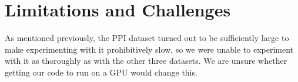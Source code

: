 \documentclass{article}
\begin{document}
    \section{Limitations and Challenges}\label{sec:limitations-and-challenges}
    As mentioned previously, the PPI dataset turned out to be sufficiently large to make experimenting with it prohibitively slow, so we were unable to experiment with it as thoroughly as with the other three datasets. We are unsure whether getting our code to run on a GPU would change this.

    
\end{document}
